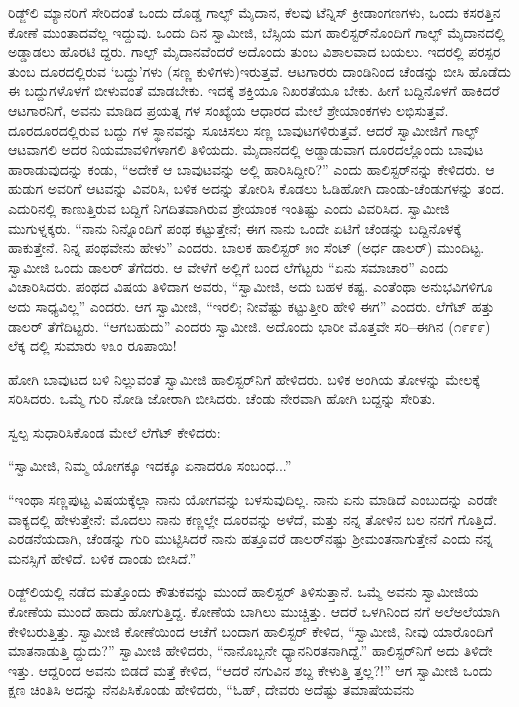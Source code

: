 ರಿಡ್ಜ್​ಲಿ ಮ್ಯಾನರಿಗೆ ಸೇರಿದಂತೆ ಒಂದು ದೊಡ್ಡ ಗಾಲ್ಫ್ ಮೈದಾನ, ಕೆಲವು ಟೆನ್ನಿಸ್ ಕ್ರೀಡಾಂಗಣಗಳು, ಒಂದು ಕಸರತ್ತಿನ ಕೋಣೆ ಮುಂತಾದವೆಲ್ಲ ಇದ್ದುವು. ಒಂದು ದಿನ ಸ್ವಾಮೀಜಿ, ಬೆಸ್ಸಿಯ ಮಗ ಹಾಲಿಸ್ಟರ್​ನೊಂದಿಗೆ ಗಾಲ್ಫ್ ಮೈದಾನದಲ್ಲಿ ಅಡ್ಡಾಡಲು ಹೊರಟಿ ದ್ದರು. ಗಾಲ್ಪ್ ಮೈದಾನವೆಂದರೆ ಅದೊಂದು ತುಂಬ ವಿಶಾಲವಾದ ಬಯಲು. ಇದರಲ್ಲಿ ಪರಸ್ಪರ ತುಂಬ ದೂರದಲ್ಲಿರುವ ‘ಬದ್ದು’ಗಳು (ಸಣ್ಣ ಕುಳಿಗಳು)ಇರುತ್ತವೆ. ಆಟಗಾರರು ದಾಂಡಿನಿಂದ ಚೆಂಡನ್ನು ಬೀಸಿ ಹೊಡೆದು ಈ ಬದ್ದುಗಳೊಳಗೆ ಬೀಳುವಂತೆ ಮಾಡಬೇಕು. ಇದಕ್ಕೆ ಶಕ್ತಿಯೂ ನಿಖರತೆಯೂ ಬೇಕು. ಹೀಗೆ ಬದ್ದಿನೊಳಗೆ ಹಾಕಿದರೆ ಆಟಗಾರನಿಗೆ, ಅವನು ಮಾಡಿದ ಪ್ರಯತ್ನ ಗಳ ಸಂಖ್ಯೆಯ ಆಧಾರದ ಮೇಲೆ ಶ್ರೇಯಾಂಕಗಳು ಲಭಿಸುತ್ತವೆ. ದೂರದೂರದಲ್ಲಿರುವ ಬದ್ದು ಗಳ ಸ್ಥಾನವನ್ನು ಸೂಚಿಸಲು ಸಣ್ಣ ಬಾವುಟಗಳಿರುತ್ತವೆ. ಆದರೆ ಸ್ವಾಮೀಜಿಗೆ ಗಾಲ್ಫ್ ಆಟವಾಗಲಿ ಅದರ ನಿಯಮಾವಳಿಗಳಾಗಲಿ ತಿಳಿಯದು. ಮೈದಾನದಲ್ಲಿ ಅಡ್ಡಾಡುವಾಗ ದೂರದಲ್ಲೊಂದು ಬಾವುಟ ಹಾರಾಡುವುದನ್ನು ಕಂಡು, “ಅದೇಕೆ ಆ ಬಾವುಟವನ್ನು ಅಲ್ಲಿ ಹಾರಿಸಿದ್ದೀರಿ?” ಎಂದು ಹಾಲಿಸ್ಟರ್​ನನ್ನು ಕೇಳಿದರು. ಆ ಹುಡುಗ ಅವರಿಗೆ ಆಟವನ್ನು ವಿವರಿಸಿ, ಬಳಿಕ ಅದನ್ನು ತೋರಿಸಿ ಕೊಡಲು ಓಡಿಹೋಗಿ ದಾಂಡು-ಚೆಂಡುಗಳನ್ನು ತಂದ. ಎದುರಿನಲ್ಲಿ ಕಾಣುತ್ತಿರುವ ಬದ್ದಿಗೆ ನಿಗದಿತವಾಗಿರುವ ಶ್ರೇಯಾಂಕ ಇಂತಿಷ್ಟು ಎಂದು ವಿವರಿಸಿದ. ಸ್ವಾಮೀಜಿ ಮುಗುಳ್ನಕ್ಕರು. “ನಾನು ನಿನ್ನೊಂದಿಗೆ ಪಂಥ ಕಟ್ಟುತ್ತೇನೆ; ಈಗ ನಾನು ಒಂದೇ ಏಟಿಗೆ ಚೆಂಡನ್ನು ಬದ್ದಿನೊಳಕ್ಕೆ ಹಾಕುತ್ತೇನೆ. ನಿನ್ನ ಪಂಥವೇನು ಹೇಳು” ಎಂದರು. ಬಾಲಕ ಹಾಲಿಸ್ಟರ್ ೫ಂ ಸೆಂಟ್ (ಅರ್ಧ ಡಾಲರ್​) ಮುಂದಿಟ್ಟ. ಸ್ವಾಮೀಜಿ ಒಂದು ಡಾಲರ್ ತೆಗೆದರು. ಆ ವೇಳೆಗೆ ಅಲ್ಲಿಗೆ ಬಂದ ಲೆಗೆಟ್ಟರು “ಏನು ಸಮಾಚಾರ” ಎಂದು ವಿಚಾರಿಸಿದರು. ಪಂಥದ ವಿಷಯ ತಿಳಿದಾಗ ಅವರು, “ಸ್ವಾಮೀಜಿ, ಅದು ಬಹಳ ಕಷ್ಟ. ಎಂತೆಂಥಾ ಅನುಭವಿಗಳಿಗೂ ಅದು ಸಾಧ್ಯವಿಲ್ಲ” ಎಂದರು. ಆಗ ಸ್ವಾಮೀಜಿ, “ಇರಲಿ; ನೀವೆಷ್ಟು ಕಟ್ಟುತ್ತೀರಿ ಹೇಳಿ ಈಗ” ಎಂದರು. ಲೆಗೆಟ್ ಹತ್ತು ಡಾಲರ್ ತೆಗೆದಿಟ್ಟರು. “ಆಗಬಹುದು” ಎಂದರು ಸ್ವಾಮೀಜಿ. ಅದೊಂದು ಭಾರೀ ಮೊತ್ತವೇ ಸರಿ–ಈಗಿನ (೧೯೯೯) ಲೆಕ್ಕ ದಲ್ಲಿ ಸುಮಾರು ೪೩ಂ ರೂಪಾಯಿ!

ಹೋಗಿ ಬಾವುಟದ ಬಳಿ ನಿಲ್ಲುವಂತೆ ಸ್ವಾಮೀಜಿ ಹಾಲಿಸ್ಟರ್​ನಿಗೆ ಹೇಳಿದರು. ಬಳಿಕ ಅಂಗಿಯ ತೋಳನ್ನು ಮೇಲಕ್ಕೆ ಸರಿಸಿದರು. ಒಮ್ಮೆ ಗುರಿ ನೋಡಿ ಜೋರಾಗಿ ಬೀಸಿದರು. ಚೆಂಡು ನೇರವಾಗಿ ಹೋಗಿ ಬದ್ದನ್ನು ಸೇರಿತು.

ಸ್ವಲ್ಪ ಸುಧಾರಿಸಿಕೊಂಡ ಮೇಲೆ ಲೆಗೆಟ್ ಕೇಳಿದರು:

“ಸ್ವಾಮೀಜಿ, ನಿಮ್ಮ ಯೋಗಕ್ಕೂ ಇದಕ್ಕೂ ಏನಾದರೂ ಸಂಬಂಧ...”

“ಇಂಥಾ ಸಣ್ಣಪುಟ್ಟ ವಿಷಯಕ್ಕೆಲ್ಲಾ ನಾನು ಯೋಗವನ್ನು ಬಳಸುವುದಿಲ್ಲ. ನಾನು ಏನು ಮಾಡಿದೆ ಎಂಬುದನ್ನು ಎರಡೇ ವಾಕ್ಯದಲ್ಲಿ ಹೇಳುತ್ತೇನೆ: ಮೊದಲು ನಾನು ಕಣ್ಣಲ್ಲೇ ದೂರವನ್ನು ಅಳೆದೆ, ಮತ್ತು ನನ್ನ ತೋಳಿನ ಬಲ ನನಗೆ ಗೊತ್ತಿದೆ. ಎರಡನೆಯದಾಗಿ, ಚೆಂಡನ್ನು ಗುರಿ ಮುಟ್ಟಿಸಿದರೆ ನಾನು ಹತ್ತೂವರೆ ಡಾಲರ್​ನಷ್ಟು ಶ್ರೀಮಂತನಾಗುತ್ತೇನೆ ಎಂದು ನನ್ನ ಮನಸ್ಸಿಗೆ ಹೇಳಿದೆ. ಬಳಿಕ ದಾಂಡು ಬೀಸಿದೆ.”

ರಿಡ್ಜ್​ಲಿಯಲ್ಲಿ ನಡೆದ ಮತ್ತೊಂದು ಕೌತುಕವನ್ನು ಮುಂದೆ ಹಾಲಿಸ್ಟರ್ ತಿಳಿಸುತ್ತಾನೆ. ಒಮ್ಮೆ ಅವನು ಸ್ವಾಮೀಜಿಯ ಕೋಣೆಯ ಮುಂದೆ ಹಾದು ಹೋಗುತ್ತಿದ್ದ. ಕೋಣೆಯ ಬಾಗಿಲು ಮುಚ್ಚಿತ್ತು. ಆದರೆ ಒಳಗಿನಿಂದ ನಗೆ ಅಲೆಅಲೆಯಾಗಿ ಕೇಳಿಬರುತ್ತಿತ್ತು. ಸ್ವಾಮೀಜಿ ಕೋಣೆಯಿಂದ ಆಚೆಗೆ ಬಂದಾಗ ಹಾಲಿಸ್ಟರ್ ಕೇಳಿದ, “ಸ್ವಾಮೀಜಿ, ನೀವು ಯಾರೊಂದಿಗೆ ಮಾತನಾಡುತ್ತಿ ದ್ದುದು?” ಸ್ವಾಮೀಜಿ ಹೇಳಿದರು, “ನಾನೊಬ್ಬನೇ ಧ್ಯಾನನಿರತನಾಗಿದ್ದೆ.” ಹಾಲಿಸ್ಟರ್​ನಿಗೆ ಅದು ತಿಳಿದೇ ಇತ್ತು. ಆದ್ದರಿಂದ ಅವನು ಬಿಡದೆ ಮತ್ತೆ ಕೇಳಿದ, “ಆದರೆ ನಗುವಿನ ಶಬ್ದ ಕೇಳುತ್ತಿ ತ್ತಲ್ಲ?!” ಆಗ ಸ್ವಾಮೀಜಿ ಒಂದು ಕ್ಷಣ ಚಿಂತಿಸಿ ಅದನ್ನು ನೆನಪಿಸಿಕೊಂಡು ಹೇಳಿದರು, “ಓಹ್, ದೇವರು ಅದೆಷ್ಟು ತಮಾಷೆಯವನು 

